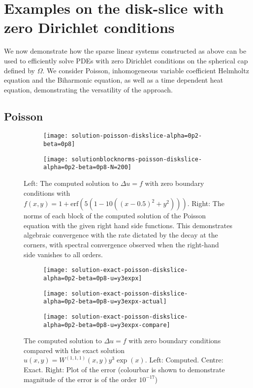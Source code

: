 \documentclass[11pt, oneside]{article}   	%
\newcommand{\Wiii}{W^{(1,1,1)}}
\begin{document}
%
\section{Examples on the disk-slice with zero Dirichlet conditions}\label{Section:Examples}

We now demonstrate how the sparse linear systems constructed as above can be used to efficiently solve PDEs with zero Dirichlet conditions on the spherical cap defined by $\Omega$. We consider Poisson, inhomogeneous variable coefficient Helmholtz equation and the Biharmonic equation, as well as a time dependent heat equation, demonstrating the versatility of the approach.

\subsection{Poisson}

\begin{figure}[t]
	\begin{subfigure}{0.3\textwidth}
	\texttt{[image: solution-poisson-diskslice-alpha=0p2-beta=0p8]}
	\centering
	\end{subfigure}
	\begin{subfigure}{0.5\textwidth}
	\centering
	\texttt{[image: solutionblocknorms-poisson-diskslice-alpha=0p2-beta=0p8-N=200]}
	\end{subfigure}
	\caption{Left: The computed solution to $\Delta u = f$ with zero boundary conditions with $f(x,y) = 1 + \text{erf}(5(1 - 10((x - 0.5)^2 + y^2)))$. Right: The norms of each block of the computed solution of the Poisson equation with the given right hand side functions. This demonstrates algebraic convergence with the rate dictated by the decay at the corners, with spectral convergence observed when the right-hand side vanishes to all orders.}
	\centering
	\label{fig:poisson}
\end{figure}

\begin{figure}[t]
	\begin{subfigure}{0.3\textwidth}
	\texttt{[image: solution-exact-poisson-diskslice-alpha=0p2-beta=0p8-u=y3expx]}
	\centering
	\end{subfigure}
	\begin{subfigure}{0.3\textwidth}
	\centering
	\texttt{[image: solution-exact-poisson-diskslice-alpha=0p2-beta=0p8-u=y3expx-actual]}
	\centering
	\end{subfigure}
	\begin{subfigure}{0.3\textwidth}
	\texttt{[image: solution-exact-poisson-diskslice-alpha=0p2-beta=0p8-u=y3expx-compare]}
	\centering
	\end{subfigure}
	\centering
	\caption{The computed solution to $\Delta u = f$ with zero boundary conditions compared with the exact solution $u(x,y) = \Wiii (x,y) y^3 \exp(x)$. Left: Computed. Centre: Exact. Right: Plot of the error (colourbar is shown to demonstrate magnitude of the error is of the order $10^{-17}$)}
	\centering
	\label{fig:poissonexact}
\end{figure}
\end{document}
